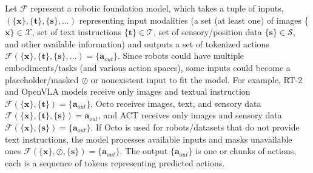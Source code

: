 {Let $\mathcal{F}$ represent a robotic foundation model, which takes a tuple of inputs, \eg $(\{\bm{x}\}, \{\bm{t}\}, \{\bm{s}\}, \dots)$ representing input modalities (\ie a set (at least one) of images \{$\bm{x}\} \in \mathcal{X}$, set of text instructions $\{\bm{t}\} \in \mathcal{T}$, set of sensory/position data $\{\bm{s}\}\in \mathcal{S}$, and other available information) and outputs a set of tokenized actions $\mathcal{F}(\{\bm{x}\}, \{\bm{t}\}, \{\bm{s}\}, \dots)=\{\bm{a}_{out}\}$.
Since robots could have multiple embodiments/tasks (and various action spaces), some inputs could become a placeholder/masked $\oslash$ or nonexistent input to fit the model.}
For example, RT-2 and OpenVLA models receive only images and textual instruction $\mathcal{F}(\{\bm{x}\}, \{\bm{t}\})=\{\bm{a}_{out}\}$, 
Octo receives images, text, and sensory data $\mathcal{F}(\{\bm{x}\}, \{\bm{t}\}, \{\bm{s}\})=\bm{a}_{out}$, and ACT receives only images and sensory data $\mathcal{F}(\{\bm{x}\}, \{\bm{s}\})=\{\bm{a}_{out}\}$.
If Octo is used for robots/datasets that do not provide text instructions, the model processes available inputs and masks unavailable ones $\mathcal{F}(\{\bm{x}\}, \oslash,\{\bm{s}\})=\{\bm{a}_{out}\}$.
The output $\{\bm{a}_{out}\}$ is one or chunks of actions, each is a sequence of tokens representing predicted actions.



